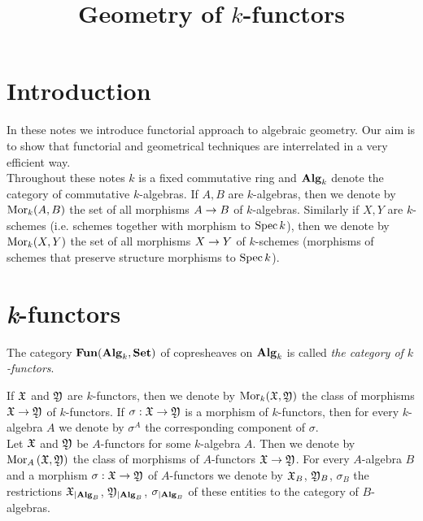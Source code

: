 



\title{Geometry of $k$-functors}
\date{}
\maketitle

\section{Introduction}
\noindent
In these notes we introduce functorial approach to algebraic geometry. Our aim is to show that functorial and geometrical techniques are interrelated in a very efficient way.\\
Throughout these notes $k$ is a fixed commutative ring and $\mathbf{Alg}_k$ denote the category of commutative $k$-algebras. If $A, B$ are $k$-algebras, then we denote by $\mathrm{Mor}_k(A, B)$ the set of all morphisms $A\rightarrow B$ of $k$-algebras. Similarly if $X, Y$ are $k$-schemes (i.e. schemes together with morphism to $\mathrm{Spec}\, k$), then we denote by $\mathrm{Mor}_k(X,Y)$ the set of all morphisms $X\rightarrow Y$ of $k$-schemes (morphisms of schemes that preserve structure morphisms to $\mathrm{Spec}\, k$).

\section{\textit{k}-functors}

\begin{definition}
The category $\mathbf{Fun}(\mathbf{Alg}_k,\mathbf{Set})$ of copresheaves on $\mathbf{Alg}_k$ is called \textit{the category of $k$-functors}.
\end{definition}
\noindent
If ${\mathfrak X}$ and ${\mathfrak Y}$ are $k$-functors, then we denote by $\mathrm{Mor}_k({\mathfrak X},{\mathfrak Y})$ the class of morphisms ${\mathfrak X}\rightarrow {\mathfrak Y}$ of $k$-functors. If $\sigma:{\mathfrak X}\rightarrow {\mathfrak Y}$ is a morphism of $k$-functors, then for every $k$-algebra $A$ we denote by $\sigma^A$ the corresponding component of $\sigma$.\\
Let ${\mathfrak X}$ and ${\mathfrak Y}$ be $A$-functors for some $k$-algebra $A$. Then we denote by $\mathrm{Mor}_A\left({\mathfrak X},{\mathfrak Y}\right)$ the class of morphisms of $A$-functors ${\mathfrak X}\rightarrow {\mathfrak Y}$. For every $A$-algebra $B$ and a morphism $\sigma:{\mathfrak X}\rightarrow {\mathfrak Y}$ of $A$-functors we denote by ${\mathfrak X}_{B}$, ${\mathfrak Y}_{B}$, $\sigma_{B}$ the restrictions ${\mathfrak X}_{\mid \mathbf{Alg}_B}$, ${\mathfrak Y}_{\mid \mathbf{Alg}_B}$, $\sigma_{\mid \mathbf{Alg}_B}$ of these entities to the category of $B$-algebras. 

